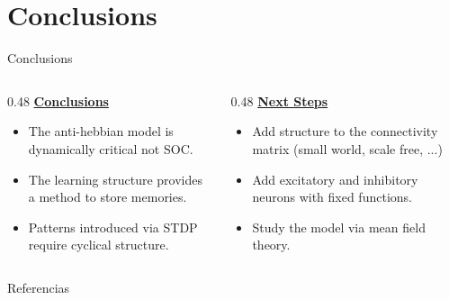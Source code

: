 \documentclass[10pt]{beamer}
\begin{document}
\section{Conclusions}
\begin{frame}{Conclusions}
    \begin{columns}[c]
        \begin{column}{0.48\textwidth}
            \centering
            \textbf{\Large \underline{Conclusions}}
            \vspace{0.15in}
            \begin{itemize}
                \item The anti-hebbian model is dynamically critical not SOC.
                \item The learning structure provides a method to store memories.
                \item Patterns introduced via STDP require cyclical structure.
            \end{itemize}
        \end{column}
        \begin{column}{0.48\textwidth}
            \centering
            \textbf{\Large \underline{Next Steps}}
            \vspace{0.15in}
            \begin{itemize}
                \item Add structure to the connectivity matrix (small world, scale free, ...)
                \item Add excitatory and inhibitory neurons with fixed functions.
                \item Study the model via mean field theory.
            \end{itemize}
        \end{column}
    \end{columns}

\end{frame}

\begin{frame}{Referencias}
    \printbibliography
\end{frame}
\end{document}
